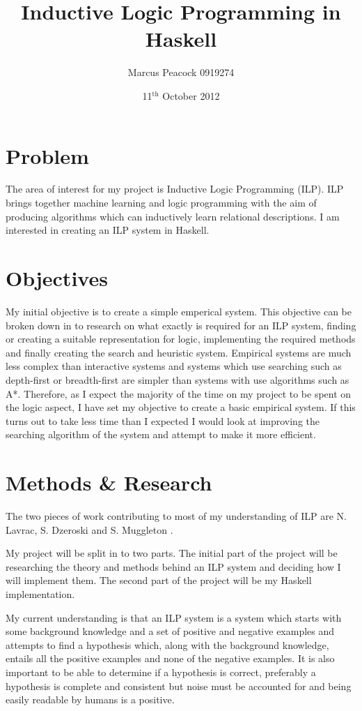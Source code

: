 \documentclass{article}
\title{Inductive Logic Programming in Haskell}
\author{Marcus Peacock 0919274}
\date{11$^{\textrm{th}}$ October 2012}
\begin{document}
\maketitle

\section*{Problem}

The area of interest for my project is Inductive Logic Programming (ILP). ILP
brings together machine learning and logic programming with the aim of
producing algorithms which can inductively learn relational descriptions. I am 
interested in creating an ILP system in Haskell.

\section*{Objectives}

My initial objective is to create a simple emperical system. This objective can
be broken down in to research on what exactly is required for an ILP system,
finding or creating a suitable representation for logic, implementing the
required methods and finally creating the search and heuristic system.
Empirical systems are much
less complex than interactive systems and systems which use searching
such as depth-first or breadth-first are simpler than systems with use
algorithms such as A*. Therefore, as I expect the majority of the time on my
project to be spent on the logic aspect, I have set my objective to create a
basic empirical system. If this turns out to take less time than I expected I
would look at improving the searching algorithm of the system and attempt to
make it more efficient.

\section*{Methods \& Research}

The two pieces of work contributing to most of my understanding of ILP are N. Lavrac, S. Dzeroski \cite{lavdzer} and S. Muggleton \cite{mugg}.

My project will be split in to two parts. The initial part of the project will
be researching the theory and methods behind an ILP system and deciding how I
will implement them. The second part of the project will be my Haskell
implementation.

My current understanding is that an ILP system is a system which starts with
some background knowledge and a set of positive and negative examples and
attempts to find a hypothesis which, along with the background knowledge, entails
all the positive examples and none of the negative examples. It is also
important to be able to determine if a hypothesis is correct, preferably a
hypothesis is complete and consistent but noise must be accounted for and being
easily readable by humans is a positive.
\end{document}
